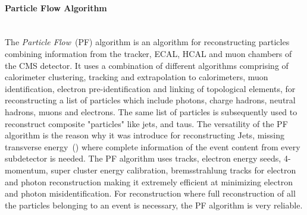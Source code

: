 \paragraph*{Particle Flow Algorithm} \mbox{}\\
The \textit{Particle Flow}~(PF) algorithm is an algorithm for reconstructing particles combining information from the tracker, ECAL, HCAL and muon chambers of the CMS detector.
It uses a combination of different algorithms comprising of calorimeter clustering, tracking and extrapolation to calorimeters, muon identification, electron pre-identification and linking of topological elements, for reconstructing a list of particles which include photons, charge hadrons, neutral hadrons, muons and electrons. The same list of particles is subsequently used to reconstruct composite "particles" like jets, \MET and taus. The versatility of the PF algorithm is the reason why it was introduce for reconstructing Jets, missing transverse energy~(\MET) where complete information of the event content from every subdetector is needed. The PF algorithm uses tracks, electron energy seeds, 4-momentum, super cluster energy calibration, bremsstrahlung tracks for electron and photon reconstruction making it extremely efficient at minimizing electron and photon misidentification.
For \MET reconstruction where full reconstruction of all the particles belonging to an event is necessary, the PF algorithm is very reliable. 
